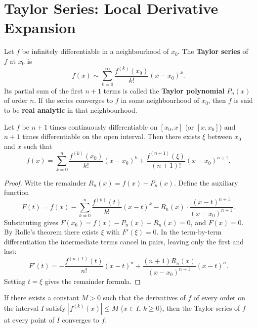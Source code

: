 \section{\texorpdfstring{Taylor Series: Local Derivative Expansion}{Taylor Series}}

\begin{definition}\label{def:taylor_series}
Let $f$ be infinitely differentiable in a neighbourhood of $x_0$. The \textbf{Taylor series} of $f$ at $x_0$ is
\[
f(x) \sim \sum_{k=0}^{\infty} \frac{f^{(k)}(x_0)}{k!}(x - x_0)^k.
\]
Its partial sum of the first $n+1$ terms is called the \textbf{Taylor polynomial} $P_n(x)$ of order $n$. If the series converges to $f$ in some neighbourhood of $x_0$, then $f$ is said to be \textbf{real analytic} in that neighbourhood.
\end{definition}

\begin{theorem}\label{thm:taylor_lagrange}
Let $f$ be $n+1$ times continuously differentiable on $[x_0, x]$ (or $[x, x_0]$) and $n+1$ times differentiable on the open interval. Then there exists $\xi$ between $x_0$ and $x$ such that
\[
f(x) = \sum_{k=0}^{n} \frac{f^{(k)}(x_0)}{k!}(x-x_0)^k + \frac{f^{(n+1)}(\xi)}{(n+1)!}(x-x_0)^{n+1}.
\]
\end{theorem}

\begin{proof}
Write the remainder $R_n(x) = f(x) - P_n(x)$. Define the auxiliary function
\[
F(t) = f(x) - \sum_{k=0}^{n} \frac{f^{(k)}(t)}{k!}(x-t)^k - R_n(x)\cdot\frac{(x-t)^{n+1}}{(x-x_0)^{n+1}}.
\]
Substituting gives $F(x_0) = f(x) - P_n(x) - R_n(x) = 0$, and $F(x) = 0$. By Rolle's theorem there exists $\xi$ with $F'(\xi) = 0$. In the term-by-term differentiation the intermediate terms cancel in pairs, leaving only the first and last:
\[
F'(t) = -\frac{f^{(n+1)}(t)}{n!}(x-t)^n + \frac{(n+1) R_n(x)}{(x-x_0)^{n+1}}(x-t)^n.
\]
Setting $t = \xi$ gives the remainder formula.
\end{proof}

\begin{corollary}\label{cor:taylor_analytic}
If there exists a constant $M > 0$ such that the derivatives of $f$ of every order on the interval $I$ satisfy $|f^{(k)}(x)| \le M$ ($x \in I$, $k \ge 0$), then the Taylor series of $f$ at every point of $I$ converges to $f$.
\end{corollary}

